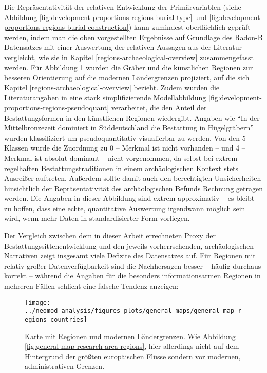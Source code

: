 \documentclass[openany,twoside,twocolumn]{book}
\begin{document}
Die Repräsentativität der relativen Entwicklung der Primärvariablen (siehe Abbildung \ref{fig:development-proportions-regions-burial-type} und \ref{fig:development-proportions-regions-burial-construction}) kann zumindest oberflächlich geprüft werden, indem man die oben vorgestellten Ergebnisse auf Grundlage des Radon-B Datensatzes mit einer Auswertung der relativen Aussagen aus der Literatur vergleicht, wie sie in Kapitel \ref{regions-archaeological-overview} zusammengefasst werden. Für Abbildung \ref{fig:general-map-regions-countries} wurden die Gräber und die künstlichen Regionen zur besseren Orientierung auf die modernen Ländergrenzen projiziert, auf die sich Kapitel \ref{regions-archaeological-overview} bezieht. Zudem wurden die Literaturangaben in eine stark simplifizierende Modellabbildung \ref{fig:development-proportions-regions-pseudoquant} verarbeitet, die den Anteil der Bestattungsformen in den künstlichen Regionen wiedergibt. Angaben wie ``In der Mittelbronzezeit dominiert in Süddeutschland die Bestattung in Hügelgräbern'' wurden klassifiziert um pseudoquantitativ visualierbar zu werden. Von den 5 Klassen wurde die Zuordnung zu 0 -- Merkmal ist nicht vorhanden -- und 4 -- Merkmal ist absolut dominant -- nicht vorgenommen, da selbst bei extrem regelhaften Bestattungstraditionen in einem archäologischen Kontext stets Ausreißer auftreten. Außerdem sollte damit auch den berechtigten Unsicherheiten hinsichtlich der Repräsentativität des archäologischen Befunds Rechnung getragen werden. Die Angaben in dieser Abbildung sind extrem approximativ -- es bleibt zu hoffen, dass eine echte, quantitative Auswertung irgendwann möglich sein wird, wenn mehr Daten in standardisierter Form vorliegen.

Der Vergleich zwischen dem in dieser Arbeit errechneten Proxy der Bestattungssittenentwicklung und den jeweils vorherrschenden, archäologischen Narrativen zeigt insgesamt viele Defizite des Datensatzes auf. Für Regionen mit relativ großer Datenverfügbarkeit sind die Nachhersagen besser -- häufig durchaus korrekt -- während die Angaben für die besonders informationsarmen Regionen in mehreren Fällen schlicht eine falsche Tendenz anzeigen:

\begin{figure}
\texttt{[image: ../neomod\_analysis/figures\_plots/general\_maps/general\_map\_regions\_countries]} \caption[Karte mit Regionen und modernen Ländergrenzen]{Karte mit Regionen und modernen Ländergrenzen. Wie Abbildung \ref{fig:general-map-research-area-regions}, hier allerdings nicht auf dem Hintergrund der größten europäischen Flüsse sondern vor modernen, administrativen Grenzen.}\label{fig:general-map-regions-countries}
\end{figure}
\end{document}
